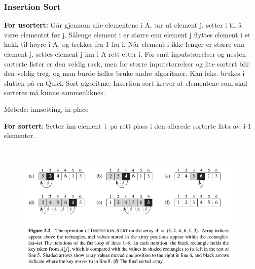 \documentclass[12pt]{report}
\begin{document}
\subsubsection*{Insertion Sort}
\setlength{\parskip}{0.0pt}
\textbf{For usortert:} Går gjennom alle elementene i A, tar ut element j, setter i til å være elementet før j. Sålenge element i er større enn element j flyttes element i et hakk til høyre i A, og trekker fra 1 fra i. Når element i ikke lenger er større enn element j, settes element j inn i A rett etter i. For små inputstørrelser og nesten sorterte lister er den veldig rask, men for større inputstørrelser og lite sortert blir den veldig treg, og man burde heller bruke andre algoritmer. Kan feks. brukes i slutten på en Quick Sort algoritme. Insertion sort krever at elementene som skal sorteres må kunne sammenliknes.\par

Metode: innsetting, in-place\par


\vspace{\baselineskip}
\textbf{For sortert}: Setter inn element i på rett plass i den allerede sorterte lista av i-1 elementer.\par




\begin{figure}[H]
	\begin{Center}
		\includegraphics[width=6.27in,height=2.93in]{./media/image33.png}
	\end{Center}
\end{figure}


\end{document}
